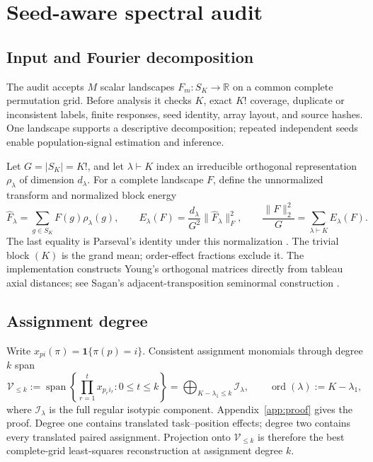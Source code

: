 \documentclass{article}
\newcommand{\Sgroup}{S_K}
\newcommand{\R}{\mathbb{R}}
\begin{document}
\section{Seed-aware spectral audit}

\subsection{Input and Fourier decomposition}

The audit accepts $M$ scalar landscapes $F_m:\Sgroup\to\R$ on a common complete permutation grid. Before analysis it checks $K$, exact $K!$ coverage, duplicate or inconsistent labels, finite responses, seed identity, array layout, and source hashes. One landscape supports a descriptive decomposition; repeated independent seeds enable population-signal estimation and inference.

Let $G=|S_K|=K!$, and let $\lambda\vdash K$ index an irreducible orthogonal representation $\rho_\lambda$ of dimension $d_\lambda$. For a complete landscape $F$, define the unnormalized transform and normalized block energy
\begin{equation}
  \widehat F_\lambda=\sum_{g\in S_K}F(g)\rho_\lambda(g),\qquad
  E_\lambda(F)=\frac{d_\lambda}{G^2}\lVert\widehat F_\lambda\rVert_F^2,\qquad
  \frac{\lVert F\rVert_2^2}{G}=\sum_{\lambda\vdash K}E_\lambda(F).
  \label{eq:spectrum}
\end{equation}
The last equality is Parseval's identity under this normalization \citep{diaconis1988group}. The trivial block $(K)$ is the grand mean; order-effect fractions exclude it. The implementation constructs Young's orthogonal matrices directly from tableau axial distances; see Sagan's adjacent-transposition seminormal construction \citep[Ex.~2.12.11]{sagan2001symmetric}.

\subsection{Assignment degree}

Write $x_{pi}(\pi)=\mathbf 1\{\pi(p)=i\}$. Consistent assignment monomials through degree $k$ span
\begin{equation}
  \mathcal V_{\leq k}:=\operatorname{span}\!\left\{\prod_{r=1}^{t}x_{p_ri_r}:0\leq t\leq k\right\}
  =\bigoplus_{K-\lambda_1\leq k}\mathcal I_\lambda,
  \qquad \operatorname{ord}(\lambda):=K-\lambda_1,
  \label{eq:degree}
\end{equation}
where $\mathcal I_\lambda$ is the full regular isotypic component. Appendix~\ref{app:proof} gives the proof. Degree one contains translated task--position effects; degree two contains every translated paired assignment. Projection onto $\mathcal V_{\leq k}$ is therefore the best complete-grid least-squares reconstruction at assignment degree $k$.
\end{document}
